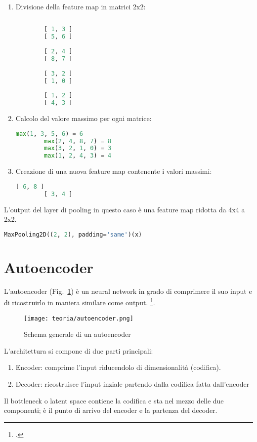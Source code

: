 \begin{enumerate}
    \item Divisione della feature map in matrici 2x2:
    \begin{lstlisting}[language=Python, frame=none]
    
        [ 1, 3 ]
        [ 5, 6 ]
        
        [ 2, 4 ]
        [ 8, 7 ]
        
        [ 3, 2 ]
        [ 1, 0 ]
        
        [ 1, 2 ]
        [ 4, 3 ]

    \end{lstlisting}
    \item Calcolo del valore massimo per ogni matrice:
    
    \begin{lstlisting}[language=Python, frame=none]
        max(1, 3, 5, 6) = 6
        max(2, 4, 8, 7) = 8
        max(3, 2, 1, 0) = 3
        max(1, 2, 4, 3) = 4
    \end{lstlisting}

    \item Creazione di una nuova feature map contenente i valori massimi:
    \begin{lstlisting}[language=Python, frame=none]
        [ 6, 8 ]
        [ 3, 4 ]
    \end{lstlisting}
\end{enumerate}
L'output del layer di pooling in questo caso è una feature map ridotta da 4x4 a 2x2.

\begin{lstlisting}[language=Python, frame=none]
    MaxPooling2D((2, 2), padding='same')(x)
\end{lstlisting}

\newpage

\section{Autoencoder}
L'autoencoder (Fig.~\ref{fig:autoencoder-teoria}) è un neural network in grado di comprimere il suo input e di ricostruirlo in maniera similare come output. \footcite[p.~499]{Goodfellow-et-al-2016}.

\begin{figure}[!h] 
    \centering 
    \texttt{[image: teoria/autoencoder.png]} 
    \caption{Schema generale di un autoencoder}
    \label{fig:autoencoder-teoria}
  \end{figure}
L'architettura si compone di due parti principali:
\begin{enumerate}
    \item Encoder: comprime l'input riducendolo di dimensionalità (codifica).
    \item Decoder: ricostruisce l'input inziale partendo dalla codifica fatta dall'encoder
\end{enumerate}
Il bottleneck o latent space contiene la codifica e sta nel mezzo delle due componenti; è il punto di arrivo del encoder e la partenza del decoder.

